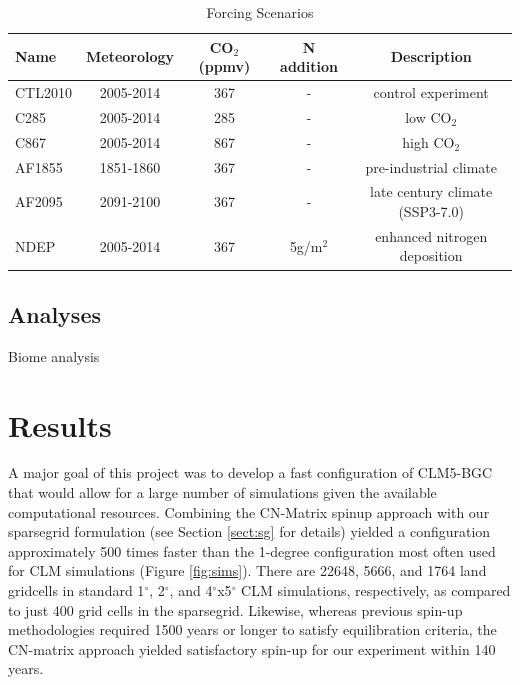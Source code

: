 \documentclass[draft]{agujournal2019}
\begin{document}
\label{sect:exps}
 \begin{table}[h]
 \caption{Forcing Scenarios}
 \centering
 \begin{tabular}{l c c c c}
 \hline
  Name  & Meteorology & CO$_2$ (ppmv) & N addition & Description \\
 \hline
   CTL2010  & 2005-2014 & 367 & - & control experiment\\
   C285        & 2005-2014 & 285 & - & low CO$_2$ \\
   C867        & 2005-2014 & 867 & - & high CO$_2$ \\
   AF1855    & 1851-1860 & 367 & - & pre-industrial climate \\
   AF2095    & 2091-2100 & 367 & - & late century climate (SSP3-7.0) \\
   NDEP      & 2005-2014 & 367 & 5g/m$^2$ & enhanced nitrogen deposition \\
 \hline
 \end{tabular}
 \label{tab:exps}
 \end{table}

\subsection{Analyses}

Biome analysis

\section{Results}
A major goal of this project was to develop a fast configuration of CLM5-BGC that would allow for a large number of simulations given the available computational resources.
Combining the CN-Matrix spinup approach with our sparsegrid formulation (see Section \ref{sect:sg} for details) yielded a configuration approximately 500 times faster than the 1-degree configuration most often used for CLM simulations (Figure \ref{fig:sims}).
There are 22648, 5666, and 1764 land gridcells in standard 1$^{\circ}$, 2$^{\circ}$, and 4$^{\circ}$x5$^{\circ}$ CLM simulations, respectively, as compared to just 400 grid cells in the sparsegrid.
Likewise, whereas previous spin-up methodologies required 1500 years or longer to satisfy equilibration criteria, the CN-matrix approach yielded satisfactory spin-up for our experiment within 140 years.
\end{document}
